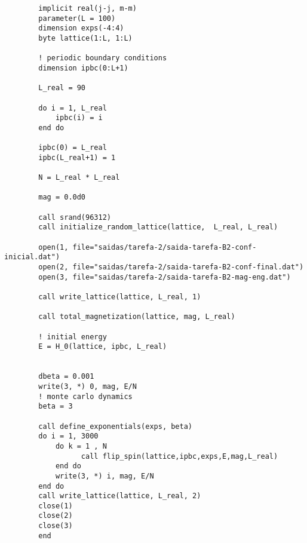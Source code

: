 
\begin{verbatim}
        implicit real(j-j, m-m)
        parameter(L = 100)
        dimension exps(-4:4)
        byte lattice(1:L, 1:L)

        ! periodic boundary conditions
        dimension ipbc(0:L+1)
    
        L_real = 90
        
        do i = 1, L_real
            ipbc(i) = i
        end do

        ipbc(0) = L_real
        ipbc(L_real+1) = 1

        N = L_real * L_real

        mag = 0.0d0
        
        call srand(96312)
        call initialize_random_lattice(lattice,  L_real, L_real)
        
        open(1, file="saidas/tarefa-2/saida-tarefa-B2-conf-inicial.dat")
        open(2, file="saidas/tarefa-2/saida-tarefa-B2-conf-final.dat")
        open(3, file="saidas/tarefa-2/saida-tarefa-B2-mag-eng.dat")
        
        call write_lattice(lattice, L_real, 1) 

        call total_magnetization(lattice, mag, L_real)
         
        ! initial energy
        E = H_0(lattice, ipbc, L_real)


        dbeta = 0.001
        write(3, *) 0, mag, E/N
        ! monte carlo dynamics
        beta = 3

        call define_exponentials(exps, beta)
        do i = 1, 3000
            do k = 1 , N
                  call flip_spin(lattice,ipbc,exps,E,mag,L_real)
            end do   
            write(3, *) i, mag, E/N
        end do
        call write_lattice(lattice, L_real, 2) 
        close(1)
        close(2)
        close(3)
        end
\end{verbatim}